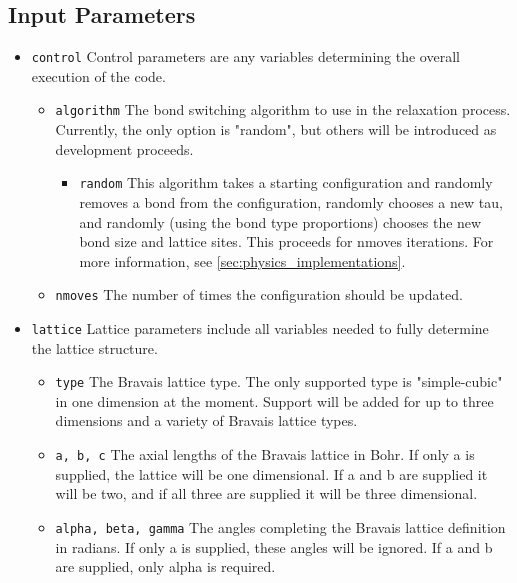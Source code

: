 \subsection{Input Parameters}
\begin{itemize}
  \item \texttt{control}
    Control parameters are any variables determining the overall execution of 
    the code. 
    \begin{itemize}
      \item \texttt{algorithm}
        The bond switching algorithm to use in the relaxation process.
        Currently, the only option is "random", but others will be introduced
        as development proceeds.
        \begin{itemize}
          \item \texttt{random}
            This algorithm takes a starting configuration and randomly removes
            a bond from the configuration, randomly chooses a new tau, and 
            randomly (using the bond type proportions) chooses the new bond
            size and lattice sites.
            This proceeds for nmoves iterations.
            For more information, see \ref{sec:physics_implementations}.
        \end{itemize}
      \item \texttt{nmoves}
        The number of times the configuration should be updated.
    \end{itemize}
  \item \texttt{lattice}
    Lattice parameters include all variables needed to fully determine the 
    lattice structure. 
    \begin{itemize}
      \item \texttt{type}
        The Bravais lattice type. 
        The only supported type is "simple-cubic" in one dimension at the 
        moment. 
        Support will be added for up to three dimensions and a variety of 
        Bravais lattice types.
      \item \texttt{a, b, c}
        The axial lengths of the Bravais lattice in Bohr.
        If only a is supplied, the lattice will be one dimensional.
        If a and b are supplied it will be two, and if all three are 
        supplied it will be three dimensional. 
      \item \texttt{alpha, beta, gamma}
        The angles completing the Bravais lattice definition in radians. 
        If only a is supplied, these angles will be ignored.
        If a and b are supplied, only alpha is required. 

\end{itemize}
\end{itemize}
